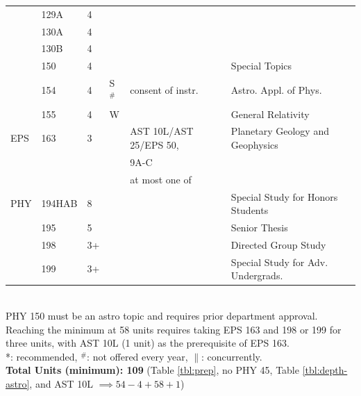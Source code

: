 \documentclass[12pt]{article}
\begin{document}
\begin{tabular}{|llllll|}
    & 129A & 4 &  &  & \\  
    & 130A & 4 &  &  & \\  
    & 130B & 4 &  &  & \\  
    & 150  & 4 &  &  & Special Topics\\  
    & 154  & 4 & S$^\#$ & consent of instr. & Astro. Appl. of Phys. \\
    & 155  & 4 & W &  & General Relativity \\ 
EPS & 163  & 3 &  & AST 10L/AST 25/EPS 50, & Planetary Geology and Geophysics\\ 
    &      &   &  & 9A-C & \\ 
\hline
& & & & at most one of & \\ 
\hline
PHY & 194HAB & 8 &  &  & Special Study for Honors Students\\ 
    & 195  & 5 &  &  & Senior Thesis\\
    & 198  & 3+ &  &  & Directed Group Study\\ 
    & 199  & 3+ &  &  & Special Study for Adv. Undergrads.\\ 
\hline
\end{tabular}\\
\noindent
PHY 150 must be an astro topic and requires prior department approval.  Reaching the minimum at 58 units requires taking EPS 163 and 198 or 199 for three units, with AST 10L (1 unit) as the prerequisite of EPS 163.\\
*: recommended, $^\#$: not offered every year, $\parallel$: concurrently.\\
\noindent
\noindent
{\bf Total Units (minimum): 109} (Table \ref{tbl:prep}, no PHY 45, Table \ref{tbl:depth-astro}, and AST 10L $\implies 54-4+58+1$)
\end{document}
